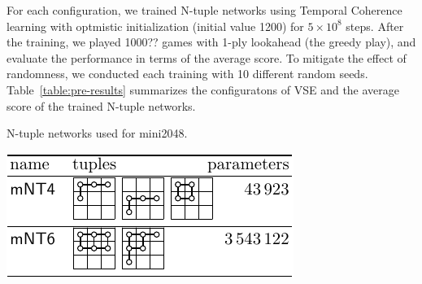 
For each configuration, we trained N-tuple networks using Temporal Coherence learning with optmistic initialization (initial value 1200) for $5\times 10^8$ steps.  After the training, we played 1000?? games with 1-ply lookahead (the greedy play), and evaluate the performance in terms of the average score.  To mitigate the effect of randomness, we conducted each training with 10 different random seeds.
Table~\ref{table:pre-results} summarizes the configuratons of VSE and the average score of the trained N-tuple networks.

\begin{table}
 \caption{N-tuple networks used for mini2048.}
 \label{table:mNT}
 \centering\includegraphics[]{figures/mNT-table.pdf}
\end{table}

